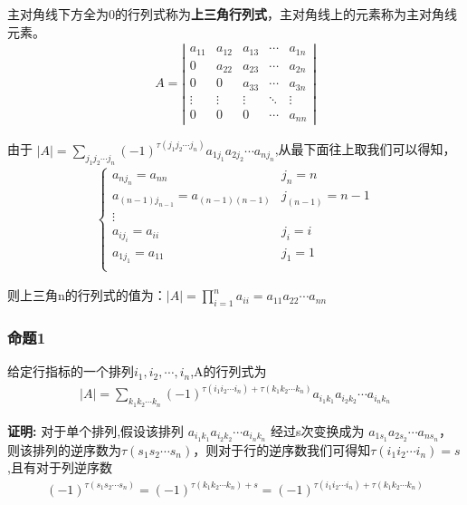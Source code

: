 \documentclass[10pt, a4paper, oneside, UTF8]{ctexbook}
\begin{document}
主对角线下方全为0的行列式称为\textbf{上三角行列式}，主对角线上的元素称为主对角线元素。
\begin{align}
  A = \left|
  \begin{matrix}
    a_{11} & a_{12} & a_{13} & \cdots & a_{1n} \\
    0      & a_{22} & a_{23} & \cdots & a_{2n} \\
    0      & 0      & a_{33} & \cdots & a_{3n} \\
    \vdots & \vdots & \vdots & \ddots & \vdots \\
    0      & 0      & 0      & \cdots & a_{nn}
  \end{matrix}\right|
\end{align}

由于 $\left|A\right| = \sum\limits_{j_1j_2 \cdots
j_n}^{}(-1)^{\tau(j_1j_2 \cdots j_n)}a_{1j_1}a_{2j_2}\cdots a_{n
j_n}$,从最下面往上取我们可以得知，
\begin{align}
  \begin{cases}
    a_{nj_n} = a_{nn} & j_{n} = n\\
    a_{(n-1)j_{n-1}} = a_{(n-1)(n-1)} & j_{(n-1)} = n-1\\
    \vdots & \\
    a_{ij_i} = a_{ii} & j_i = i\\
    a_{1j_1} = a_{11} & j_1 = 1\\
  \end{cases}
\end{align}

则上三角n的行列式的值为：$\left|A\right| = \prod\limits_{i=1}^{n}a_{ii} =
a_{11}a_{22}\cdots a_{nn}$

\subsubsection*{命题1}
给定行指标的一个排列$i_1,i_2,\cdots,i_n$,A的行列式为
\begin{align}
  \left|A\right| = \sum\limits_{k_1k_2 \cdots
  k_n}^{}(-1)^{\tau(i_1i_2 \cdots i_n)+\tau(k_1k_2 \cdots
  k_n)}a_{i_1k_1}a_{i_2k_2}\cdots a_{i_nk_n}
\end{align}

\noindent\textbf{证明:}
对于单个排列,假设该排列 $a_{i_1k_1}a_{i_2k_2}\cdots a_{i_nk_n}$ 经过s次变换成为
$a_{1s_1}a_{2s_2}\cdots a_{ns_n}$，则该排列的逆序数为$\tau(s_1s_2 \cdots
s_n)$，则对于行的逆序数我们可得知$\tau(i_1 i_2 \cdots i_n) = s$,且有对于列逆序数
\begin{align}
  (-1)^{\tau(s_1s_2 \cdots s_n)} = (-1)^{\tau(k_1k_2 \cdots k_n) + s}
  = (-1)^{\tau(i_1i_2 \cdots i_n) + \tau(k_1k_2 \cdots k_n)}
\end{align}
\end{document}

